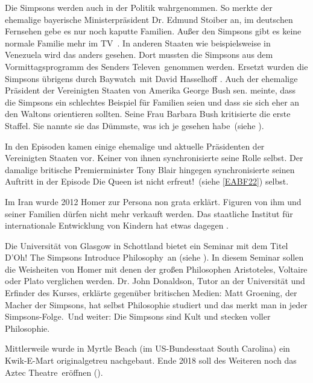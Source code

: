 Die Simpsons werden auch in der Politik wahrgenommen. So merkte der ehemalige bayerische Ministerpräsident Dr. Edmund Stoiber an, im deutschen Fernsehen gebe es \glqq nur noch kaputte Familien. Außer den Simpsons gibt es keine normale Familie mehr im TV\grqq\ \cite{Stoiber}. In anderen Staaten wie beispielsweise in Venezuela wird das anders gesehen. Dort mussten die Simpsons aus dem Vormittagsprogramm des Senders \glqq Televen\grqq\ genommen werden. Ersetzt wurden die Simpsons übrigens durch \glqq Baywatch\grqq\ mit David Hasselhoff \cite{Venzuela}. Auch der ehemalige Präsident der Vereinigten Staaten von Amerika George Bush sen. meinte, dass die Simpsons ein schlechtes Beispiel für Familien seien und dass sie sich eher an den Waltons orientieren sollten. Seine Frau Barbara Bush kritisierte die erste Staffel. Sie nannte sie \glqq das Dümmste, was ich je gesehen habe\grqq\ (siehe \cite{Reiss19}).

In den Episoden kamen einige ehemalige und aktuelle Präsidenten der Vereinigten Staaten vor. Keiner von ihnen synchronisierte seine Rolle selbst. Der damalige britische Premierminister Tony Blair hingegen synchronisierte seinen Auftritt in der Episode \glqq Die Queen ist nicht erfreut!\grqq\ (siehe \ref{EABF22}) selbst.

Im Iran wurde 2012 Homer zur Persona non grata erklärt. Figuren von ihm und seiner Familien dürfen nicht mehr verkauft werden. Das staatliche Institut für internationale Entwicklung von Kindern hat etwas dagegen \cite{IranMullahs}.

Die Universität von Glasgow in Schottland bietet ein Seminar mit dem Titel \glqq D'Oh! The Simpsons Introduce Philosophy\grqq\ an (siehe \cite{UoG}). In diesem Seminar sollen die Weisheiten von Homer mit denen der großen Philosophen Aristoteles, Voltaire oder Plato verglichen werden. Dr. John Donaldson, Tutor an der Universität und Erfinder des Kurses, erklärte gegenüber britischen Medien: \glqq Matt Groening, der Macher der Simpsons, hat selbst Philosophie studiert und das merkt man in jeder Simpsons-Folge.\grqq\ Und weiter: \glqq Die Simpsons sind Kult und stecken voller Philosophie.\grqq

Mittlerweile wurde in Myrtle Beach (im US-Bundesstaat South Carolina) ein Kwik-E-Mart originalgetreu nachgebaut. Ende 2018 soll des Weiteren noch das \glqq Aztec Theatre\grqq\ eröffnen (\cite{SVZ18}).

